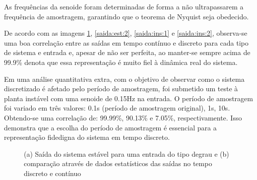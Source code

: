 As frequências da senoide foram determinadas de forma a não ultrapassarem a frequência de amostragem, garantindo que o teorema de Nyquist seja obedecido.

De acordo com as imagens \ref{saida:est:1}, \ref{saida:est:2}, \ref{saida:ins:1} e \ref{saida:ins:2}, observa-se uma boa correlação entre as saídas em tempo contínuo e discreto para cada tipo de sistema e entrada e, apesar de não ser perfeita, ao manter-se sempre acima de 99.9\% denota que essa representação é muito fiel à dinâmica real do sistema.

Em uma análise quantitativa extra, com o objetivo de observar como o sistema discretizado é afetado pelo período de amostragem, foi submetido um teste à planta instável com uma senoide de 0.15Hz na entrada. O período de amostragem foi variado em três valores: 0.1s (período de amostragem original), 1s, 10s. Obtendo-se uma correlação de: 99.99\%, 90.13\% e 7.05\%, respectivamente. Isso demonstra que a escolha do período de amostragem é essencial para a representação fidedigna do sistema em tempo discreto. 

\begin{figure}[H]
\begin{center}
\end{center}
\caption{(a) Saída do sistema estável para uma entrada do tipo degrau e (b) comparação através de dados estatísticos das saídas no tempo discreto e contínuo}
\label{saida:est:1} 
\end{figure}


